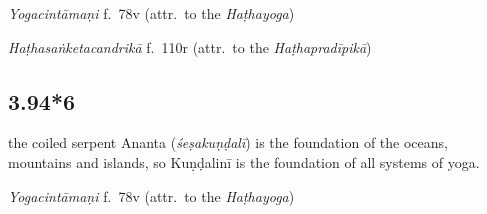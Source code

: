 \begin{ekdosis}
\begin{testimonia}[hp03_094_5]
\emph{Yogacintāmaṇi} f.~78v (attr.~to the \emph{Haṭhayoga})
\begin{versinnote}
\end{versinnote}

\emph{Haṭhasaṅketacandrikā} f.~110r (attr.~to the \emph{Haṭhapradīpikā})
\begin{versinnote}
\end{versinnote}
\end{testimonia}



\subsection*{3.94*6}
\begin{translation}[hp03_094_6]
[Just as] the coiled serpent Ananta (\emph{śeṣa\-kuṇḍalī}) is the foundation of the oceans, mountains and islands, so Kuṇḍalinī is the foundation of all systems of yoga.
\end{translation}


\begin{testimonia}[hp03_094_6]

\emph{Yogacintāmaṇi} f.~78v (attr.~to the \emph{Haṭhayoga})
\begin{versinnote}
\end{versinnote}
\end{testimonia}


\end{ekdosis}
